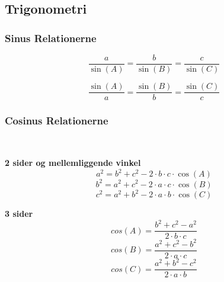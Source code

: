 
\subsection{Trigonometri}

\subsubsection{Sinus Relationerne}
\begin{minipage}{0.4\textwidth}
    \[
    \frac{a}{\sin(A)} = \frac{b}{\sin(B)} = \frac{c}{\sin(C)}
    \]
\end{minipage}
\hfill
\begin{minipage}{0.4\textwidth}
    \[
    \frac{\sin(A)}{a} = \frac{\sin(B)}{b} = \frac{\sin(C)}{c}
    \]
\end{minipage}

\begin{figure}[H]
    \centering
\end{figure}

\subsubsection{Cosinus Relationerne}
\

\begin{minipage}{0.5\textwidth}
    \centering
    \textbf{2 sider og mellemliggende vinkel}
    \[
        a^2 = b^2 + c^2 - 2\cdot b\cdot c\cdot \cos(A)
    \]
    \[
        b^2 = a^2 + c^2 - 2\cdot a\cdot c\cdot \cos(B)
    \]
    \[
        c^2 = a^2 + b^2 - 2\cdot a\cdot b\cdot \cos(C)
    \]
\end{minipage}
\hfill
\begin{minipage}{0.3\textwidth}
    \centering
    \textbf{3 sider}
    \[
        cos(A) = \frac{b^2 + c^2 - a^2}{2\cdot b\cdot c}
    \]
    \[
        cos(B) = \frac{a^2 + c^2 - b^2}{2\cdot a\cdot c}
    \]
    \[
        cos(C) = \frac{a^2 + b^2 - c^2}{2\cdot a\cdot b}
    \]
\end{minipage}
